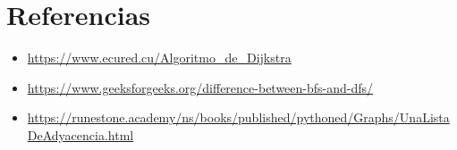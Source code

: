 \documentclass{article}
\begin{document}
    \section{Referencias}
    
    \begin{itemize}			
    	\item \url{https://www.ecured.cu/Algoritmo_de_Dijkstra}
    	\item \url{https://www.geeksforgeeks.org/difference-between-bfs-and-dfs/}
    	\item \url{https://runestone.academy/ns/books/published/pythoned/Graphs/UnaListaDeAdyacencia.html}     
    \end{itemize}	

\end{document}
